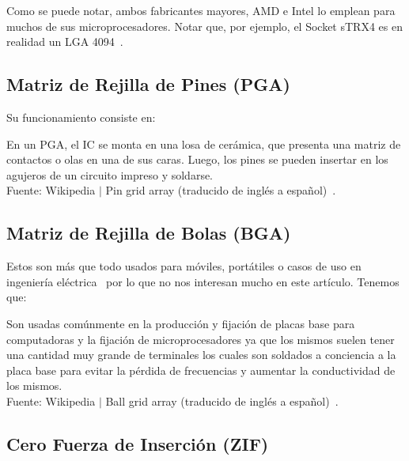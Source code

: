 \documentclass[conference]{IEEEtran}
\begin{document}
    \bigbreak

    Como se puede notar, ambos fabricantes mayores, AMD e Intel lo emplean
    para muchos de sus microprocesadores. Notar que, por ejemplo, el Socket
    sTRX4 es en realidad un LGA 4094~\cite{wikipedia-lga-2021D}.

    \subsection{Matriz de Rejilla de Pines (PGA)}\label{subsec:matriz-de
    -rejilla-de-pines-(pga)}

    Su funcionamiento consiste en:

    \bigbreak

    \begin{displayquote}
        En un PGA, el IC se monta en una losa de cerámica, que presenta una
        matriz de contactos o olas en una de sus caras. Luego, los pines se
        pueden insertar en los agujeros de un circuito impreso y soldarse.\\
        \small
        Fuente: Wikipedia $\mid$ Pin grid array (traducido de inglés a
        español)~\cite{wikipedia-pga-2021C}.
    \end{displayquote}

    \subsection{Matriz de Rejilla de Bolas (BGA)}\label{subsec:matriz-de
    -rejilla-de-bolas-(bga)}

    Estos son más que todo usados para móviles, portátiles o casos de uso en
    ingeniería eléctrica~\cite{wikipedia-bga-2021B} por lo que no nos
    interesan mucho en este artículo. Tenemos que:

    \begin{displayquote}
        Son usadas comúnmente en la producción y fijación de placas base para
        computadoras y la fijación de microprocesadores ya que los mismos
        suelen tener una cantidad muy grande de terminales los cuales son
        soldados a conciencia a la placa base para evitar la pérdida de
        frecuencias y aumentar la conductividad de los mismos.\\
        \small
        Fuente: Wikipedia $\mid$ Ball grid array (traducido de inglés a
        español)~\cite{wikipedia-bga-2021B}.
    \end{displayquote}

    \subsection{Cero Fuerza de Inserción (ZIF)}\label{subsec:cero-fuerza-de
    -inserción-(zif)}
\end{document}
